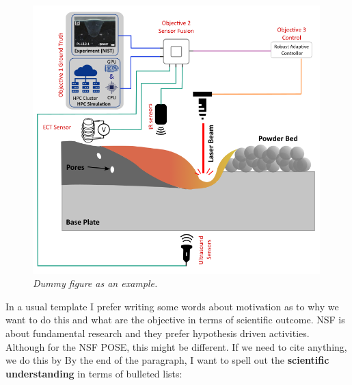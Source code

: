 \documentclass[11pt]{article}
\begin{document}
\begin{figure} %
	\vspace{-20pt} %
	\centering
	\begin{mdframed}[roundcorner=5pt, linewidth=0pt, innerleftmargin=-0pt, innerrightmargin=0pt]
		\includegraphics[width=0.99\textwidth]{./figures/SensorFusion.png}
	\end{mdframed}
	\vspace{-24pt}   %
	\caption{\emph{Dummy figure as an example.}}
	\label{fig:sensor-fusion}
	\vspace{-10pt}  %
\end{figure}

In a usual template I prefer writing some words about motivation as to why we want to do this and what are the objective in terms of scientific outcome. NSF is about fundamental research and they prefer hypothesis driven activities. Although for the NSF POSE, this might be different. If we need to cite anything, we do this by \cite{aminPhysicsGuidedHeat2024} By the end of the paragraph, I want to spell out the \textbf{scientific understanding} in terms of bulleted lists:
\end{document}
